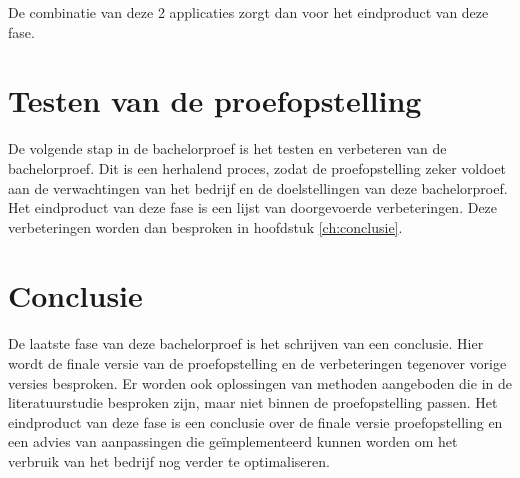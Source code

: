 De combinatie van deze 2 applicaties zorgt dan voor het eindproduct van deze fase.

\section{Testen van de proefopstelling}
\label{sec:methodologie-testen-proefopstelling}

De volgende stap in de bachelorproef is het testen en verbeteren van de bachelorproef. Dit is een herhalend proces, zodat de proefopstelling zeker voldoet aan de verwachtingen van het bedrijf en de doelstellingen van deze bachelorproef. Het eindproduct van deze fase is een lijst van doorgevoerde verbeteringen. Deze verbeteringen worden dan besproken in hoofdstuk \ref{ch:conclusie}.

\section{Conclusie}
\label{sec:methodologie-conclusie}

De laatste fase van deze bachelorproef is het schrijven van een conclusie. Hier wordt de finale versie van de proefopstelling en de verbeteringen tegenover vorige versies besproken. Er worden ook oplossingen van methoden aangeboden die in de literatuurstudie besproken zijn, maar niet binnen de proefopstelling passen. Het eindproduct van deze fase is een conclusie over de finale versie proefopstelling en een advies van aanpassingen die geïmplementeerd kunnen worden om het verbruik van het bedrijf nog verder te optimaliseren.